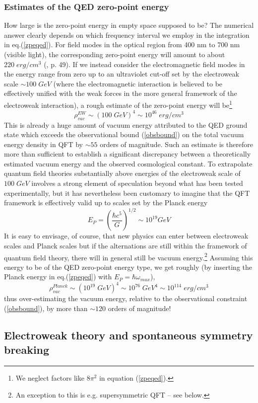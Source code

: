 \documentclass[12pt]{article}
\def\ss{\subsection}
\def\sss{\subsubsection}
\begin{document}
\sss{Estimates of the QED zero-point energy}

How large is the zero-point energy in empty space supposed to be? The
numerical answer clearly depends on which frequency interval we
employ in the integration in eq.(\ref{zpeqed}). For field modes in
the optical region from 400 nm to 700 nm (visible light), the
corresponding zero-point energy will amount to about $220 \;
erg/cm^3$ (\cite{milonni94}, p. 49). If we instead consider the
electromagnetic field modes in the energy range from zero up to an
ultraviolet cut-off set by the electroweak scale $\sim 100 \; GeV$
(where the electromagnetic interaction is believed to be
effectively unified with the weak forces in the more general
framework of the electroweak interaction), a rough estimate of the
zero-point energy will be\footnote{We neglect factors like $8
\pi^2$ in equation (\ref{zpeqed}).}
$$
\rho^{EW}_{vac} \sim (100 \; GeV)^4 \sim 
10^{46} \; erg/cm^3
$$
This is already a huge amount of vacuum energy attributed to the
QED ground state which exceeds the observational bound
(\ref{obsbound}) on the total vacuum energy density in QFT by
$\sim 55$ orders of magnitude. Such an estimate is therefore more
than sufficient to establish a significant discrepancy between a
theoretically estimated vacuum energy and the observed
cosmological constant. To extrapolate quantum field theories
substantially above energies of the electroweak scale of $100 \;
GeV$ involves a strong element of speculation beyond what has been
tested experimentally, but it has nevertheless been customary to
imagine that the QFT framework is effectively valid up to scales
set by the Planck energy
$$
E_P = \left(\frac{\hbar c^5}{G} \right)^{1/2} \sim 10^{19} GeV
$$
It is easy to envisage, of course, that new physics can enter
between electroweak scales and Planck scales but if the
alternations are still within the framework of quantum field
theory, there will in general still be vacuum energy.\footnote{An
exception to this is e.g. supersymmetric QFT -- see below.}
Assuming this energy to be of the QED zero-point energy type,
we get roughly (by inserting the Planck energy in eq.(\ref{zpeqed}) 
with $E_P = \hbar \omega_{max}$), 
$$
\rho^{Planck}_{vac} \sim (10^{19} \; GeV)^4 \sim 10^{76} \; GeV^4
\sim 10^{114} \; erg/cm^3
$$
thus over-estimating the vacuum energy, relative to the 
observational constraint (\ref{obsbound}),
by more than $\sim 120$ orders of magnitude!

\ss{Electroweak theory and spontaneous symmetry breaking}
\end{document}
